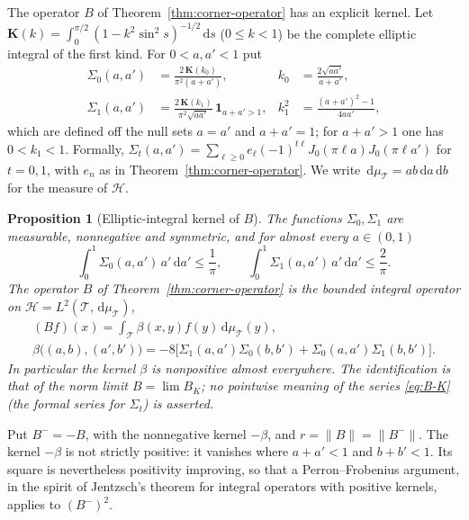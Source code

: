 \documentclass[preprint,12pt,a4paper]{elsarticle}
\newtheorem{proposition}[theorem]{Proposition}
\theoremstyle{remark}
\newcommand{\dd}{\,\mathrm d}
\begin{document}
The operator $B$ of Theorem~\ref{thm:corner-operator} has an explicit kernel.
Let $\mathbf K(k)=\int_0^{\pi/2}(1-k^2\sin^2s)^{-1/2}\dd s$ ($0\le k<1$) be the
complete elliptic integral of the first kind. For $0<a,a'<1$ put
\begin{equation}\label{eq:sigma-kernels}
 \begin{aligned}
 \Sigma_0(a,a')&=\frac{2\,\mathbf K(k_0)}{\pi^2(a+a')},&
 k_0&=\frac{2\sqrt{aa'}}{a+a'},\\[1ex]
 \Sigma_1(a,a')&=\frac{2\,\mathbf K(k_1)}{\pi^2\sqrt{aa'}}\,\boldsymbol1_{a+a'>1},&
 k_1^2&=\frac{(a+a')^2-1}{4aa'},
 \end{aligned}
\end{equation}
which are defined off the null sets $a=a'$ and $a+a'=1$; for $a+a'>1$ one has
$0<k_1<1$. Formally, $\Sigma_t(a,a')=\sum_{\ell\ge0}e_\ell(-1)^{t\ell}J_0(\pi\ell a)J_0(\pi\ell a')$
for $t=0,1$, with $e_n$ as in Theorem~\ref{thm:corner-operator}. We write
$\dd\mu_{\mathcal T}=ab\dd a\dd b$ for the measure of $\mathcal H$.

\begin{proposition}[Elliptic-integral kernel of $B$]\label{prop:elliptic-kernel}
The functions $\Sigma_0,\Sigma_1$ are measurable, nonnegative and symmetric,
and for almost every $a\in(0,1)$
\begin{equation}\label{eq:row-bounds}
 \int_0^1\Sigma_0(a,a')\,a'\dd a'\le\frac1\pi,\qquad
 \int_0^1\Sigma_1(a,a')\,a'\dd a'\le\frac2\pi .
\end{equation}
The operator $B$ of Theorem~\ref{thm:corner-operator} is the bounded integral
operator on $\mathcal H=L^2(\mathcal T,\dd\mu_{\mathcal T})$,
\begin{equation}\label{eq:B-kernel}
 \begin{gathered}
 (Bf)(x)=\int_{\mathcal T}\beta(x,y)f(y)\dd\mu_{\mathcal T}(y),\\
 \beta\bigl((a,b),(a',b')\bigr)=-8\bigl[\Sigma_1(a,a')\Sigma_0(b,b')
  +\Sigma_0(a,a')\Sigma_1(b,b')\bigr].
 \end{gathered}
\end{equation}
In particular the kernel $\beta$ is nonpositive almost everywhere. The
identification is that of the norm limit $B=\lim B_K$; no pointwise
meaning of the series \eqref{eq:B-K} (the formal series for $\Sigma_t$) is asserted.
\end{proposition}

Put $B^-=-B$, with the nonnegative kernel $-\beta$, and $r=\|B\|=\|B^-\|$.
The kernel $-\beta$ is not strictly positive: it vanishes where
$a+a'<1$ and $b+b'<1$. Its square is nevertheless positivity improving, so
that a Perron--Frobenius argument, in the spirit of Jentzsch's theorem for
integral operators with positive kernels, applies to $(B^-)^2$.
\end{document}
